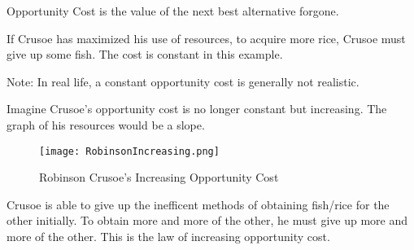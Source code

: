 \begin{definition}
    Opportunity Cost is the value of the next best alternative forgone.
    \begin{example}
    If Crusoe has maximized his use of resources, to acquire more rice, Crusoe must give up some fish.
    The cost is constant in this example.
    \end{example}
    Note: In real life, a constant opportunity cost is generally not realistic.
\end{definition}
Imagine Crusoe's opportunity cost is no longer constant but increasing.
The graph of his resources would be a slope.\\
\begin{figure}[h!]
    \centering
    \texttt{[image: RobinsonIncreasing.png]}
    \caption{Robinson Crusoe's Increasing Opportunity Cost}
\end{figure}
Crusoe is able to give up the inefficent methods of obtaining fish/rice for the other initially.
To obtain more and more of the other, he must give up more and more of the other. This is the law of increasing opportunity cost.
